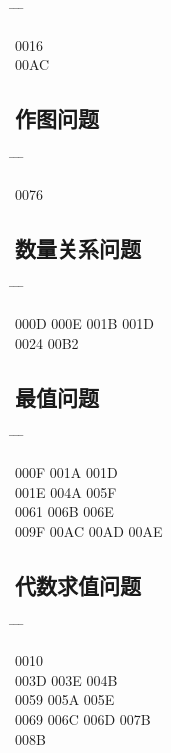 \documentclass[twoside, twocolumn]{ctexart}
\newenvironment{problist}{
  \begin{center} \ttfamily \begin{tabbing}
      \hspace{50pt} \= \hspace{50pt} \= \hspace{50pt} \= \kill
  }{ \end{tabbing} \end{center} }
\begin{document}
  \begin{problist}
    0016    \\ 00AC \\
  \end{problist}

  \subsection*{作图问题}

  \begin{problist}
    0076 \\
  \end{problist}

  \subsection*{数量关系问题}

  \begin{problist}
    000D \> 000E \> 001B \> 001D \\ 0024  \> 00B2 \\
  \end{problist}

  \subsection*{最值问题}

  \begin{problist}
    000F  \> 001A \> 001D \\ 001E \> 004A \> 005F  \\
    0061  \> 006B \> 006E \\ 009F \> 00AC \> 00AD \> 00AE \\
  \end{problist}

  \subsection*{代数求值问题}

  \begin{problist}
    0010    \\ 003D \> 003E \> 004B  \\
    0059 \> 005A \> 005E  \\ 0069 \> 006C \> 006D \> 007B \\
    008B \\
  \end{problist}
\end{document}
